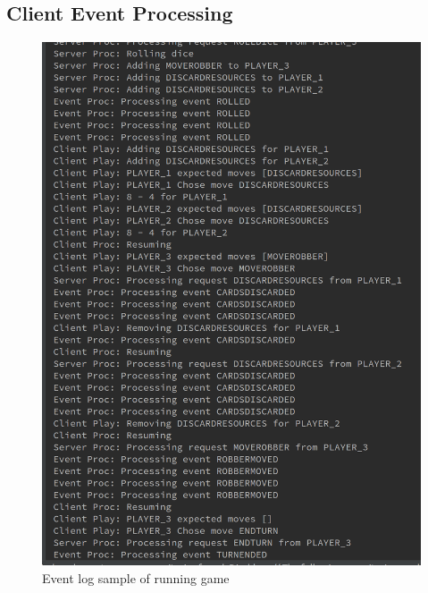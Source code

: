 \documentclass[a4paper,doc]{apa6}
\begin{document}
\subsection{Client Event Processing}
\begin{figure}[hbtp]
      \includegraphics[width=\textwidth]{eventlog}
      \caption{Event log sample of running game}
\end{figure}
\end{document}
